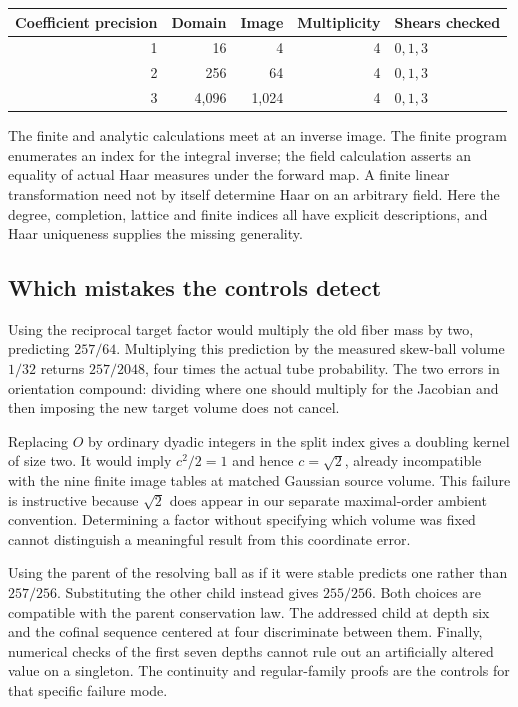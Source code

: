 \documentclass[12pt,letterpaper]{article}
\begin{document}
\begin{center}\small\begin{tabular}{@{}rrrrl@{}}\toprule
Coefficient precision & Domain & Image & Multiplicity & Shears checked\\\midrule
1 & 16 & 4 & 4 & $0,1,3$\\
2 & 256 & 64 & 4 & $0,1,3$\\
3 & 4,096 & 1,024 & 4 & $0,1,3$\\\bottomrule
\end{tabular}\end{center}
The finite and analytic calculations meet at an inverse image. The finite program enumerates an index for the integral inverse; the field calculation asserts an equality of actual Haar measures under the forward map. A finite linear transformation need not by itself determine Haar on an arbitrary field. Here the degree, completion, lattice and finite indices all have explicit descriptions, and Haar uniqueness supplies the missing generality.

\subsection{Which mistakes the controls detect}
Using the reciprocal target factor would multiply the old fiber mass by two, predicting $257/64$. Multiplying this prediction by the measured skew-ball volume $1/32$ returns $257/2048$, four times the actual tube probability. The two errors in orientation compound: dividing where one should multiply for the Jacobian and then imposing the new target volume does not cancel.

Replacing $O$ by ordinary dyadic integers in the split index gives a doubling kernel of size two. It would imply $c^2/2=1$ and hence $c=\sqrt2$, already incompatible with the nine finite image tables at matched Gaussian source volume. This failure is instructive because $\sqrt2$ does appear in our separate maximal-order ambient convention. Determining a factor without specifying which volume was fixed cannot distinguish a meaningful result from this coordinate error.

Using the parent of the resolving ball as if it were stable predicts one rather than $257/256$. Substituting the other child instead gives $255/256$. Both choices are compatible with the parent conservation law. The addressed child at depth six and the cofinal sequence centered at four discriminate between them. Finally, numerical checks of the first seven depths cannot rule out an artificially altered value on a singleton. The continuity and regular-family proofs are the controls for that specific failure mode.
\end{document}
